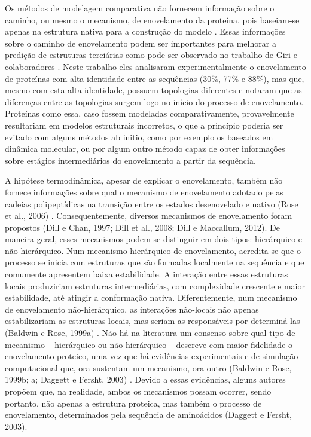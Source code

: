 Os métodos de modelagem comparativa não fornecem informação sobre o caminho, ou mesmo o mecanismo, de enovelamento da proteína, pois baseiam-se apenas na estrutura nativa para a construção do modelo \cite{Helles:2003}. Essas informações sobre o caminho de enovelamento podem ser importantes para melhorar a predição de estruturas terciárias como pode ser observado no trabalho de Giri e colaboradores \cite{Giri:2007}. Neste trabalho eles analisaram experimentalmente o enovelamento de proteínas com alta identidade entre as sequências (30\%, 77\% e 88\%), mas que, mesmo com esta alta identidade, possuem topologias diferentes e notaram que as diferenças entre as topologias surgem logo no início do processo de enovelamento. Proteínas como essa, caso fossem modeladas comparativamente, provavelmente resultariam em modelos estruturais incorretos, o que a princípio poderia ser evitado com alguns métodos ab initio, como por exemplo os baseados em dinâmica molecular, ou por algum outro método capaz de obter informações sobre estágios intermediários do enovelamento a partir da sequência.

A hipótese termodinâmica, apesar de explicar o enovelamento, também não fornece informações sobre qual o mecanismo de enovelamento adotado pelas cadeias polipeptídicas na transição entre os estados desenovelado e nativo (Rose et al., 2006)⁠ . Consequentemente, diversos mecanismos de enovelamento foram propostos (Dill e Chan, 1997; Dill et al., 2008; Dill e Maccallum, 2012). De maneira geral, esses mecanismos podem se distinguir em dois tipos: hierárquico e não-hierárquico. Num mecanismo hierárquico de enovelamento, acredita-se que o processo se inicia com estruturas que são formadas localmente na sequência e que comumente apresentem baixa estabilidade. A interação entre essas estruturas locais produziriam estruturas intermediárias, com complexidade crescente e maior estabilidade, até atingir a conformação nativa. Diferentemente, num mecanismo de enovelamento não-hierárquico, as interações não-locais não apenas estabilizariam as estruturas locais, mas seriam as responsáveis por determiná-las (Baldwin e Rose, 1999a)⁠ . Não há na literatura um consenso sobre qual tipo de mecanismo – hierárquico ou não-hierárquico – descreve com maior fidelidade o enovelamento proteico, uma vez que há evidências experimentais e de simulação computacional que, ora sustentam um mecanismo, ora outro (Baldwin e Rose, 1999b; a; Daggett e Fersht, 2003)⁠ . Devido a essas evidências, alguns autores propõem que, na realidade, ambos os mecanismos possam ocorrer, sendo portanto, não apenas a estrutura proteica, mas também o processo de enovelamento, determinados pela sequência de aminoácidos (Daggett e Fersht, 2003)⁠. 

